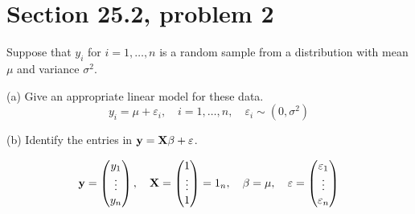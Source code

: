\section{Section 25.2, problem 2}
Suppose that $y_i$ for $i=1,\ldots,n$ is a random sample from a
distribution with mean $\mu$ and variance $\sigma^2$.

\bigskip
\noindent
(a) Give an appropriate linear model for these data.
$$y_i=\mu+\varepsilon_i,\quad i=1,\ldots,n,\quad\varepsilon_i\sim(0,\sigma^2)$$

\bigskip
\noindent
(b) Identify the entries in ${\bf y}={\bf X}\beta+\varepsilon$.

$${\bf y}=\left(\begin{matrix}y_1\cr\vdots\cr y_n\end{matrix}\right),\quad
{\bf X}=\left(\begin{matrix}1\cr\vdots\cr1\end{matrix}\right)=1_n,\quad
\beta=\mu,\quad
\varepsilon=\left(\begin{matrix}\varepsilon_1\cr\vdots\cr\varepsilon_n
\end{matrix}\right)
$$
